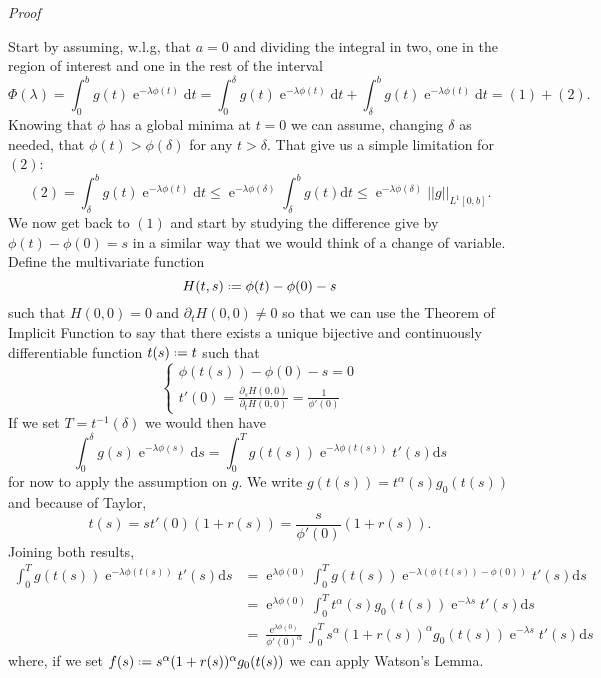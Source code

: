 \documentclass[]{report}
\makeatletter
\DeclareMathOperator{\ee}{e}
\newcommand*{\deff}{\mathrel{\vcenter{\baselineskip0.5ex \lineskiplimit0pt
			\hbox{\scriptsize.}\hbox{\scriptsize.}}}%
	=}
\newcommand{\dd}{\mathrm{d}}
\numberwithin{equation}{section} %
\newenvironment{Mproof}[1][Proof]{\par
	\pushQED{\qed}%
	\normalfont \topsep6\p@\@plus6\p@\relax
	\trivlist
	\item\relax
	{\itshape
		#1\@addpunct{.}}\hspace\labelsep\ignorespaces
}{%
	\popQED\endtrivlist\@endpefalse
}
\makeatother
\begin{document}
\begin{Mproof}
	Start by assuming, w.l.g, that $a=0$ and dividing the integral in two, one in the region of interest and one in the rest of the interval
	$$\Phi(\lambda) = \int_{0}^{b} g(t) \ee^{-\lambda \phi(t)} \dd t = \int_{0}^{\delta} g(t) \ee^{-\lambda \phi(t)} \dd t + \int_{\delta}^{b} g(t) \ee^{-\lambda \phi(t)} \dd t = (1) + (2).$$
	Knowing that $\phi$ has a global minima at $t = 0$ we can assume, changing $\delta$ as needed, that $\phi(t) > \phi(\delta)$ for any $t > \delta$. That give us a simple limitation for $(2)$:
	$$(2) = \int_{\delta}^{b} g(t) \ee^{-\lambda \phi(t)} \dd t \leq \ee^{-\lambda \phi(\delta)} \int_{\delta}^{b} g(t) \dd t \leq \ee^{-\lambda \phi(\delta)} ||g||_{L^1[0,b]}.$$
	We now get back to $(1)$ and start by studying the difference give by $\phi(t) - \phi(0) = s$ in a similar way that we would think of a change of variable. Define the multivariate function 
	$$H(t,s) \deff \phi(t) - \phi(0) - s$$
	such that $H(0,0) = 0$ and $\partial_t H(0,0) \neq 0$ so that we can use the Theorem of Implicit Function to say that there exists a unique bijective and continuously differentiable function $t(s) \deff t$ such that 
	\begin{equation*}
		\begin{cases}
		\phi(t(s)) - \phi(0) - s = 0	\\
		t'(0) = \frac{\partial_s H(0,0)}{\partial_t H(0,0)} = \frac{1}{\phi'(0)} 
		\end{cases}
	\end{equation*}
	If we set $T = t^{-1}(\delta)$ we would then have
	$$\int_{0}^{\delta} g(s) \ee^{-\lambda \phi(s)} \dd s = \int_{0}^{T} g(t(s)) \ee^{-\lambda \phi(t(s))} t'(s) \dd s$$
	for now to apply the assumption on $g$. We write $g(t(s)) = t^\alpha(s) g_0(t(s))$ and because of Taylor,
	$$t(s) = s t'(0) (1+r(s)) = \frac{s}{\phi'(0)}(1+r(s)).$$
	Joining both results,
	\begin{equation}
		\begin{split}
			\int_{0}^{T} g(t(s)) \ee^{-\lambda \phi(t(s))} t'(s) \dd s & = \ee^{\lambda \phi(0)} \int_{0}^{T} g(t(s)) \ee^{-\lambda (\phi(t(s)) - \phi(0))} t'(s) \dd s \\
			& = \ee^{\lambda \phi(0)} \int_{0}^{T} t^\alpha(s) g_0(t(s)) \ee^{-\lambda s} t'(s) \dd s \\
			& = \frac{\ee^{\lambda \phi(0)}}{\phi'(0)^\alpha} \int_{0}^{T} s^\alpha (1+r(s))^\alpha g_0(t(s)) \ee^{-\lambda s} t'(s) \dd s			
		\end{split}
	\end{equation}
	where, if we set $f(s) \deff s^\alpha (1+r(s))^\alpha g_0(t(s))$ we can apply Watson's Lemma.
\end{Mproof}
\end{document}
